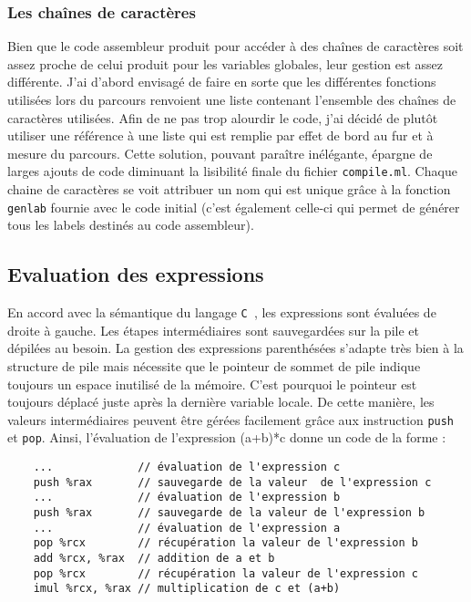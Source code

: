 \documentclass[11pt]{article}
\newcommand{\Cmm}{\texttt{C\textminus\textminus\ }}
\newcommand{\ttt}[1]{\texttt{#1}}
\begin{document}
\subsubsection{Les chaînes de caractères}
Bien que le code assembleur produit pour accéder à des chaînes de caractères soit assez proche de celui produit pour les variables globales, leur gestion est assez différente.
J'ai d'abord envisagé de faire en sorte que les différentes fonctions utilisées lors du parcours renvoient une liste contenant l'ensemble des chaînes de caractères utilisées.
Afin de ne pas trop alourdir le code, j'ai décidé de plutôt utiliser une référence à une liste qui est remplie par effet de bord au fur et à mesure du parcours.
Cette solution, pouvant paraître inélégante, épargne de larges ajouts de code diminuant la lisibilité finale du fichier \ttt{compile.ml}.
Chaque chaine de caractères se voit attribuer un nom qui est unique grâce à la fonction \ttt{genlab} fournie avec le code initial (c'est également celle-ci qui permet de générer tous les labels destinés au code assembleur).


\subsection{Evaluation des expressions}
En accord avec la sémantique du langage \Cmm , les expressions sont évaluées de droite à gauche.
Les étapes intermédiaires sont sauvegardées sur la pile et dépilées au besoin.
La gestion des expressions parenthésées s'adapte très bien à la structure de pile mais nécessite que le pointeur de sommet de pile indique toujours un espace inutilisé de la mémoire.
C'est pourquoi le pointeur est toujours déplacé juste après la dernière variable locale.
De cette manière, les valeurs intermédiaires peuvent être gérées facilement grâce aux instruction \ttt{push} et \ttt{pop}.
Ainsi, l'évaluation de l'expression (a+b)*c donne un code de la forme :
\begin{lstlisting}
    ...             // évaluation de l'expression c
    push %rax       // sauvegarde de la valeur  de l'expression c
    ...             // évaluation de l'expression b
    push %rax       // sauvegarde de la valeur de l'expression b
    ...             // évaluation de l'expression a
    pop %rcx        // récupération la valeur de l'expression b
    add %rcx, %rax  // addition de a et b
    pop %rcx        // récupération la valeur de l'expression c
    imul %rcx, %rax // multiplication de c et (a+b)
\end{lstlisting}
\end{document}
